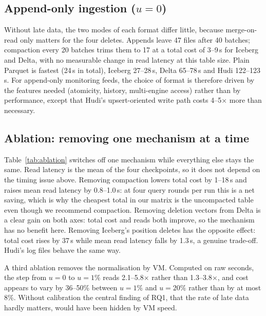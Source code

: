 \documentclass[conference]{IEEEtran}
\begin{document}
\subsection{Append-only ingestion (\texorpdfstring{$u=0$}{u=0})}
Without late data, the two modes of each format differ little, because merge-on-read only matters for the four
deletes. Appends leave 47 files after 40 batches; compaction every 20 batches trims them to 17 at a total
cost of 3--9\,s for Iceberg and Delta, with no measurable change in read latency at this table size. Plain Parquet is
fastest (24\,s in total), Iceberg 27--28\,s, Delta 65--78\,s and Hudi 122--123\,s. For append-only monitoring feeds,
the choice of format is therefore driven by the features needed (atomicity, history, multi-engine access) rather than
by performance, except that Hudi's upsert-oriented write path costs 4--5$\times$ more than necessary.

\subsection{Ablation: removing one mechanism at a time}\label{sec:ablation}
Table~\ref{tab:ablation} switches off one mechanism while everything else stays the same. Read latency is the mean of the four
checkpoints, so it does not depend on the timing issue above. Removing compaction lowers total cost by 1--18\,s and raises mean
read latency by 0.8--1.0\,s: at four query rounds per run this is a net saving, which is why the cheapest total in our matrix is
the uncompacted table even though we recommend compaction. Removing deletion vectors from Delta is a clear gain on both axes: total
cost and reads both improve, so the mechanism has no benefit here. Removing Iceberg's position deletes has the opposite effect:
total cost rises by 37\,s while mean read latency falls by 1.3\,s, a genuine trade-off. Hudi's log files behave the same way.

A third ablation removes the normalisation by VM. Computed on raw seconds, the step from $u=0$ to $u=1\%$ reads 2.1--5.8$\times$
rather than 1.3--3.8$\times$, and cost appears to vary by 36--50\% between $u=1\%$ and $u=20\%$ rather than by at most 8\%. Without
calibration the central finding of RQ1, that the rate of late data hardly matters, would have been hidden by VM speed.
\end{document}
